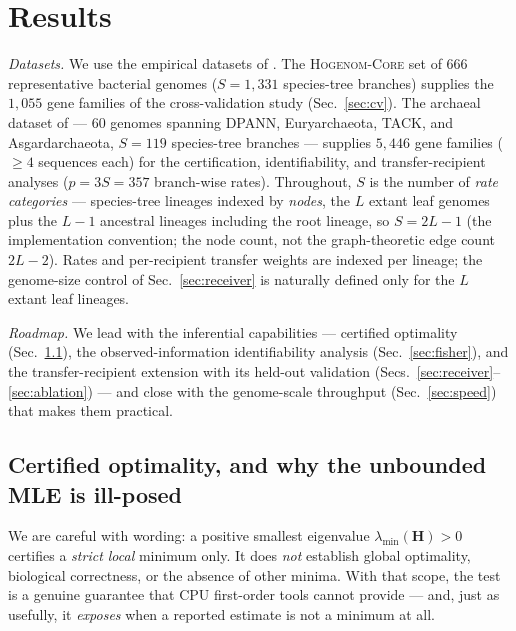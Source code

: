 \documentclass[11pt]{article}
\newcommand{\Hess}{\mathbf{H}}
\begin{document}
\section{Results}
\label{sec:results}

\noindent\emph{Datasets.} We use the empirical datasets of
\citet{Morel2024}. The \textsc{Hogenom-Core} set of $666$ representative bacterial
genomes \citep{Penel2009} ($S{=}1{,}331$ species-tree branches) supplies the
$1{,}055$ gene families of the cross-validation study (Sec.~\ref{sec:cv}). The
archaeal dataset of \citet{Williams2017,Davin2018} --- $60$ genomes spanning DPANN,
Euryarchaeota, TACK, and Asgardarchaeota, $S{=}119$ species-tree branches --- supplies
$5{,}446$ gene families ($\geq\!4$ sequences each) for the certification,
identifiability, and transfer-recipient analyses ($p{=}3S{=}357$ branch-wise rates).
Throughout, $S$ is the number of \emph{rate categories} --- species-tree lineages indexed
by \emph{nodes}, the $L$ extant leaf genomes plus the $L{-}1$ ancestral lineages including
the root lineage, so $S{=}2L{-}1$ (the implementation convention; the node count, not the
graph-theoretic edge count $2L{-}2$). Rates and per-recipient transfer weights are indexed
per lineage; the genome-size control of Sec.~\ref{sec:receiver} is naturally defined only
for the $L$ extant leaf lineages.

\noindent\emph{Roadmap.} We lead with the inferential capabilities --- certified
optimality (Sec.~\ref{sec:certify}), the observed-information identifiability analysis
(Sec.~\ref{sec:fisher}), and the transfer-recipient extension with its held-out
validation (Secs.~\ref{sec:receiver}--\ref{sec:ablation}) --- and close with the
genome-scale throughput (Sec.~\ref{sec:speed}) that makes them practical.

\subsection{Certified optimality, and why the unbounded MLE is ill-posed}
\label{sec:certify}
We are careful with wording: a positive smallest eigenvalue
$\lambda_{\min}(\Hess)>0$ certifies a \emph{strict local} minimum only. It does
\emph{not} establish global optimality, biological correctness, or the absence
of other minima. With that scope, the test is a genuine guarantee that CPU
first-order tools cannot provide --- and, just as usefully, it \emph{exposes}
when a reported estimate is not a minimum at all.
\end{document}
